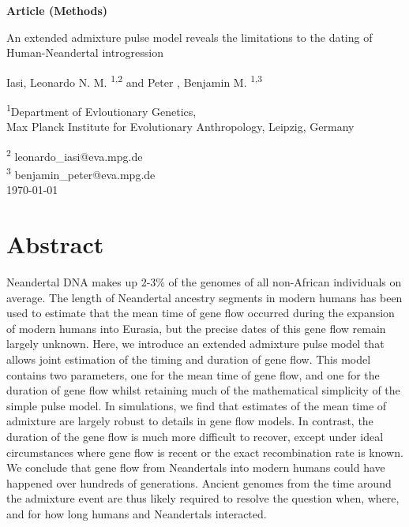 \documentclass[11pt]{article}
\begin{document}
\begin{titlepage}

    \begin{flushright}
        \large
        \textbf{Article (Methods)}
    \end{flushright}


        \vspace*{1cm}
    \begin{center}       
        \Huge
        \vspace{1cm}
        An extended admixture pulse model reveals the limitations to the dating of Human-Neandertal introgression
        
        \vspace{1.0cm}
        \large
        Iasi, Leonardo N. M. \textsuperscript{1,2} and Peter , Benjamin M. \textsuperscript{1,3} \\ 
        
        \vspace{1.0cm}
        
        \textsuperscript{1}Department of Evloutionary Genetics, \\ 
        Max Planck Institute for Evolutionary Anthropology, Leipzig, Germany
        
        \vspace{1.0cm}
        \textsuperscript{2} leonardo\_iasi@eva.mpg.de \\ \textsuperscript{3} 
        benjamin\_peter@eva.mpg.de \\
        \vspace{1.0cm}
        \today
    \end{center}  
     

            

\end{titlepage}


\section{Abstract}\label{abstract}

Neandertal DNA makes up 2-3\% of the genomes of all non-African individuals on average. The length of Neandertal ancestry segments in modern humans has been used to estimate that the mean time of gene flow occurred during the expansion of modern humans into Eurasia, but the precise dates of this gene flow remain largely unknown. Here, we introduce an extended admixture pulse model that allows joint estimation of the timing and duration of gene flow. This model contains two parameters, one for the mean time of gene flow, and one for the duration of gene flow whilst retaining much of the mathematical simplicity of the simple pulse model. In simulations, we find that estimates of the mean time of admixture are largely robust to details in gene flow models. In contrast, the duration of the gene flow is much more difficult to recover, except under ideal circumstances where gene flow is recent or the exact recombination rate is known. We conclude that gene flow from Neandertals into modern humans could have happened over hundreds of generations. Ancient genomes from the time around the admixture event are thus likely required to resolve the question when, where, and for how long humans and Neandertals interacted.
\end{document}
